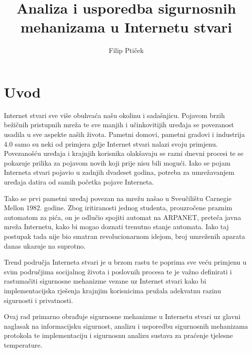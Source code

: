 \documentclass[times, utf8, diplomski]{fer}
\begin{document}

\title{Analiza i usporedba sigurnosnih mehanizama u Internetu stvari}

\author{Filip Ptiček}

\maketitle



\zahvala{}

\tableofcontents

\chapter{Uvod}
Internet stvari sve više obuhvaća našu okolinu i sadašnjicu. Pojavom brzih bežičnih pristupnih mreža te sve manjih i učinkovitijih uređaja se povezanost usadila u sve aspekte naših života. Pametni domovi, pametni gradovi i industrija 4.0 samo su neki od primjera gdje Internet stvari nalazi svoju primjenu. Povezanošću uređaja i krajnjih korisnika olakšavaju se razni dnevni procesi te se pokazuje prilika za pojavom novih koji prije nisu bili mogući. Iako se pojam Interneta stvari pojavio u zadnjih dvadeset godina, potreba za umrežavanjem uređaja datira od samih početka pojave Interneta. 

Tako se prvi pametni uređaj povezan na mrežu našao u Sveučilištu Carnegie Mellon 1982. godine. Zbog iritiranosti jednog studenta, prouzročene praznim automatom za pića, on je odlučio spojiti automat na ARPANET, preteča javna mreža Internetu, kako bi mogao doznati trenutno stanje automata\citep{Coke}. Iako taj postupak tada nije bio smatran revolucionarnom idejom, broj umreženih aparata danas ukazuje na suprotno.

Trend područja Interneta stvari je u brzom rastu te poprima sve veću primjenu u svim područjima socijalnog života i poslovnih procesa te je važno definirati i rastumačiti sigurnosne mehanizme vezane uz Internet stvari kako bi implementacijska rješenja krajnjim korisnicima pružala adekvatnu razinu sigurnosti i privatnosti.

Ovaj rad primarno obrađuje sigurnosne mehanizme u Internetu stvari uz glavni naglasak na informacijsku sigurnost, analizu i usporedbu sigurnosnih mehanizama protokola te implementaciju i sigurnosnu analizu sustava za praćenje tjelesne temperature. 
\end{document}
